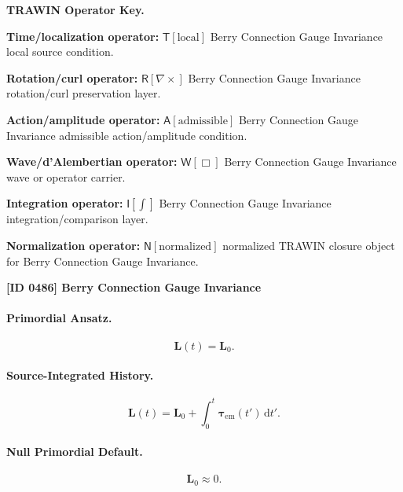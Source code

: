 \par\vspace{0.45\baselineskip}
\noindent\begin{minipage}[t]{\linewidth}
\begingroup
\small
\raggedright
\textbf{TRAWIN Operator Key.}\par
\noindent\textbf{Time/localization operator:} $\mathsf{T}\!\left[\mathrm{local}\right]$ Berry Connection Gauge Invariance local source condition.\par
\noindent\textbf{Rotation/curl operator:} $\mathsf{R}\!\left[\nabla\times\right]$ Berry Connection Gauge Invariance rotation/curl preservation layer.\par
\noindent\textbf{Action/amplitude operator:} $\mathsf{A}\!\left[\mathrm{admissible}\right]$ Berry Connection Gauge Invariance admissible action/amplitude condition.\par
\noindent\textbf{Wave/d'Alembertian operator:} $\mathsf{W}\!\left[\Box\right]$ Berry Connection Gauge Invariance wave or operator carrier.\par
\noindent\textbf{Integration operator:} $\mathsf{I}\!\left[\int\right]$ Berry Connection Gauge Invariance integration/comparison layer.\par
\noindent\textbf{Normalization operator:} $\mathsf{N}\!\left[\mathrm{normalized}\right]$ normalized TRAWIN closure object for Berry Connection Gauge Invariance.\par
\endgroup
\end{minipage}

\clearpage
\noindent\textbf{[ID 0486] Berry Connection Gauge Invariance}\par
\vspace{0.35em}
\paragraph{Primordial Ansatz.}
\begin{equation}
\mathbf{L}(t)=\mathbf{L}_0 .
\end{equation}

\paragraph{Source-Integrated History.}
\begin{equation}
\mathbf{L}(t)
=
\mathbf{L}_0
+
\int_0^t
\boldsymbol{\tau}_{\mathrm{em}}(t')
\,\mathrm{d}t' .
\end{equation}

\paragraph{Null Primordial Default.}
\begin{equation}
\mathbf{L}_0\approx 0 .
\end{equation}

